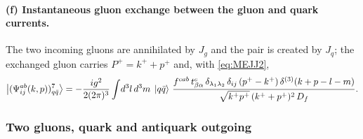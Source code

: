 \paragraph{(f) Instantaneous gluon exchange between the gluon and quark currents.}
\begin{center}
\end{center}
The two incoming gluons are annihilated by $J_{g}$ and the pair is created by $J_{q}$; the
exchanged gluon carries $P^{+}=k^{+}+p^{+}$ and, with \eqref{eq:MEJJ2},
\begin{equation}
\left|(\Psi^{ab}_{ij}(k,p))^{7}_{q\bar q}\right\rangle=-\frac{ig^{2}}{2(2\pi)^{3}}\int\!d^{3}l\,d^{3}m\;\left|q\bar q\right\rangle\,
\frac{f^{cab}\,t^{c}_{\beta\alpha}\,\delta_{\lambda_{1}\lambda_{2}}\,\delta_{ij}\,(p^{+}-k^{+})\,
\delta^{(3)}(k+p-l-m)}{\sqrt{k^{+}p^{+}}\,(k^{+}+p^{+})^{2}\,D_{f}} .
\label{eq:B1f}
\end{equation}

\subsubsection{Two gluons, quark and antiquark outgoing}

